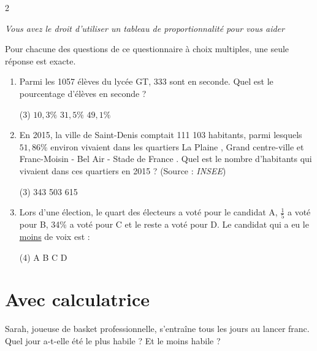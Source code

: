 \documentclass[10pt,a4paper]{article}
\begin{document}
\begin{multicols}{2}
\begin{exo}[][]
\textit{Vous avez le droit d'utiliser un tableau de proportionnalité pour vous aider}
\end{exo}

\begin{exo}[QCM][]
    
Pour chacune des questions de ce questionnaire à choix multiples, une seule réponse est exacte.

\medskip

\begin{enumerate}[leftmargin=*]
    \item Parmi les 1057 élèves du lycée GT, 333 sont en seconde. Quel est le pourcentage d'élèves en seconde ?
    \begin{tasks}(3)
        \task $10,3\%$
        \task $31,5\%$
        \task $49,1\%$
    \end{tasks}

    \item En 2015, la ville de Saint-Denis comptait 111 103 habitants, parmi lesquels $51,86\%$ environ vivaient dans les quartiers \og La Plaine \fg{}, \og Grand centre-ville \fg{} et \og Franc-Moisin - Bel Air - Stade de France \fg{}. Quel est le nombre d'habitants qui vivaient dans ces quartiers en 2015 ? (Source : \textit{INSEE})
    \begin{tasks}(3)
         343
         503
         615
    \end{tasks}
    \item Lors d'une élection, le quart des électeurs a voté pour le candidat A, \(\frac{1}{5}\) a voté pour B, 34\% a voté pour C et le reste a voté pour D. Le candidat qui a eu le \underline{moins} de voix est :\begin{tasks}(4)
        \task A
        \task B
        \task C
        \task D
    \end{tasks}
\end{enumerate}
\end{exo}


\section{Avec calculatrice}

\vspace{-0.5cm}\begin{exo}[][]
    Sarah, joueuse de basket professionnelle, s'entraîne tous les jours au lancer franc. Quel jour a-t-elle été le plus habile ? Et le moins habile ?


\end{exo}
\end{multicols}
\end{document}
